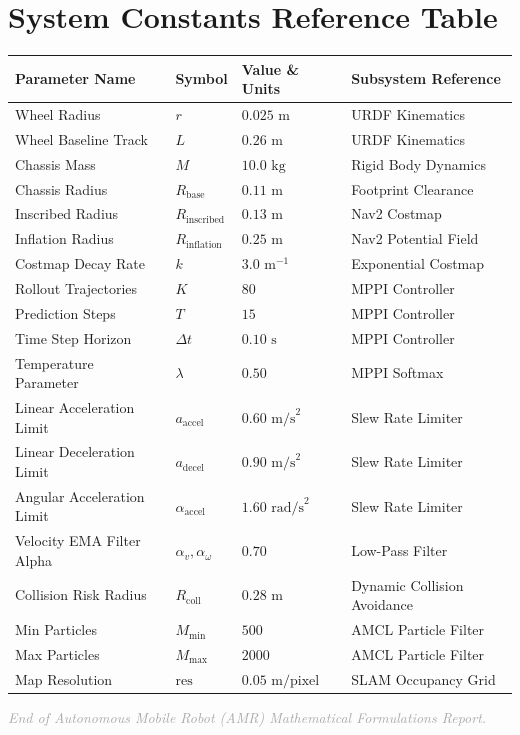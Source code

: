 \documentclass[10pt,a4paper]{article}
\begin{document}
\section{System Constants Reference Table}

\begin{center}
\begin{tabular}{|l|l|l|l|}
\hline
\textbf{Parameter Name} & \textbf{Symbol} & \textbf{Value \& Units} & \textbf{Subsystem Reference} \\
\hline
Wheel Radius & $r$ & $0.025\text{ m}$ & URDF Kinematics \\
Wheel Baseline Track & $L$ & $0.26\text{ m}$ & URDF Kinematics \\
Chassis Mass & $M$ & $10.0\text{ kg}$ & Rigid Body Dynamics \\
Chassis Radius & $R_{\text{base}}$ & $0.11\text{ m}$ & Footprint Clearance \\
Inscribed Radius & $R_{\text{inscribed}}$ & $0.13\text{ m}$ & Nav2 Costmap \\
Inflation Radius & $R_{\text{inflation}}$ & $0.25\text{ m}$ & Nav2 Potential Field \\
Costmap Decay Rate & $k$ & $3.0\text{ m}^{-1}$ & Exponential Costmap \\
Rollout Trajectories & $K$ & $80$ & MPPI Controller \\
Prediction Steps & $T$ & $15$ & MPPI Controller \\
Time Step Horizon & $\Delta t$ & $0.10\text{ s}$ & MPPI Controller \\
Temperature Parameter & $\lambda$ & $0.50$ & MPPI Softmax \\
Linear Acceleration Limit & $a_{\text{accel}}$ & $0.60\text{ m/s}^2$ & Slew Rate Limiter \\
Linear Deceleration Limit & $a_{\text{decel}}$ & $0.90\text{ m/s}^2$ & Slew Rate Limiter \\
Angular Acceleration Limit & $\alpha_{\text{accel}}$ & $1.60\text{ rad/s}^2$ & Slew Rate Limiter \\
Velocity EMA Filter Alpha & $\alpha_v, \alpha_\omega$ & $0.70$ & Low-Pass Filter \\
Collision Risk Radius & $R_{\text{coll}}$ & $0.28\text{ m}$ & Dynamic Collision Avoidance \\
Min Particles & $M_{\text{min}}$ & $500$ & AMCL Particle Filter \\
Max Particles & $M_{\text{max}}$ & $2000$ & AMCL Particle Filter \\
Map Resolution & $\text{res}$ & $0.05\text{ m/pixel}$ & SLAM Occupancy Grid \\
\hline
\end{tabular}
\end{center}

\vspace{0.5cm}
\begin{center}
\footnotesize \textcolor{darkgray}{\textit{End of Autonomous Mobile Robot (AMR) Mathematical Formulations Report.}}
\end{center}
\end{document}
